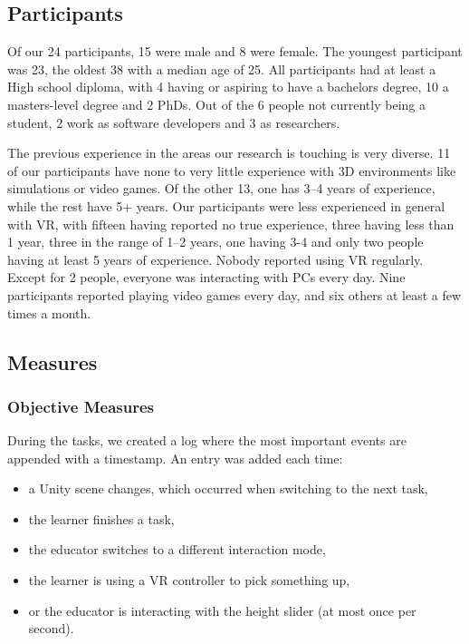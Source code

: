 \subsection{Participants}

Of our 24 participants, 15 were male and 8 were female. The youngest participant was 23, the oldest 38 with a median age of 25. All participants had at least a High school diploma, with 4 having or aspiring to have a bachelors degree, 10 a masters-level degree and 2 PhDs. Out of the 6 people not currently being a student, 2 work as software developers and 3 as researchers.

The previous experience in the areas our research is touching is very diverse. 11 of our participants have none to very little experience with 3D environments like simulations or video games. Of the other 13, one has 3–4 years of experience, while the rest have 5+ years.
%
Our participants were less experienced in general with VR, with fifteen having reported no true experience, three having less than 1 year, three in the range of 1–2 years, one having 3-4 and only two people having at least 5 years of experience. Nobody reported using VR regularly. 
%
Except for 2 people, everyone was interacting with PCs every day. Nine participants reported playing video games every day, and six others at least a few times a month.

\subsection{Measures}
\label{sec:measures}
\subsubsection{Objective Measures}

During the tasks, we created a log where the most important events are appended with a timestamp. An entry was added each time:

\begin{itemize}
    \item a Unity scene changes, which occurred when switching to the next task,
    \item the learner finishes a task,
    \item the educator switches to a different interaction mode,
    \item the learner is using a VR controller to pick something up,
    \item or the educator is interacting with the height slider (at most once per second).
\end{itemize}


